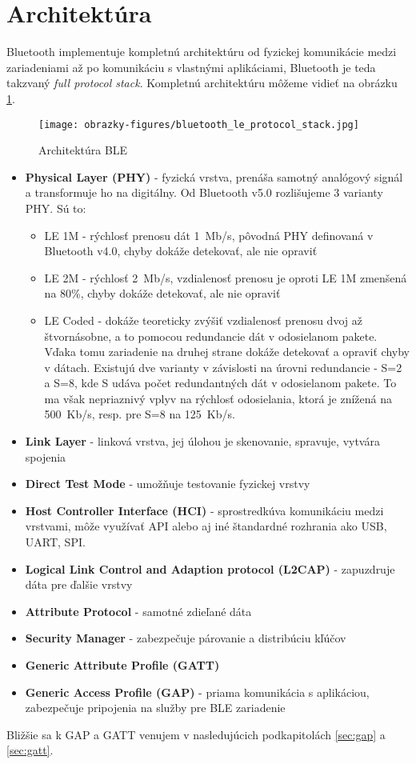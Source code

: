\section{Architektúra} \label{sec:arch}
Bluetooth implementuje kompletnú architektúru od fyzickej komunikácie medzi zariadeniami až po komunikáciu s vlastnými aplikáciami, Bluetooth je teda takzvaný \textit{full protocol stack}. Kompletnú architektúru môžeme vidieť na obrázku \ref{fig:ble_stack}.

\begin{figure}[ht]
    \centering
    \texttt{[image: obrazky-figures/bluetooth\_le\_protocol\_stack.jpg]}
    \caption{Architektúra BLE\cite{bluetooth}}
    \label{fig:ble_stack}
\end{figure}

\begin{itemize}
    \item \textbf{Physical Layer (PHY)} - fyzická vrstva, prenáša samotný analógový signál a transformuje ho na digitálny. Od Bluetooth v5.0 rozlišujeme 3 varianty PHY. Sú to:
    \begin{itemize}
        \item LE 1M - rýchlosť prenosu dát 1~Mb/s, pôvodná PHY definovaná v Bluetooth v4.0, chyby dokáže detekovať, ale nie opraviť
        \item LE 2M - rýchlosť 2~Mb/s, vzdialenosť prenosu je oproti LE 1M zmenšená na 80\%, chyby dokáže detekovať, ale nie opraviť
        \item LE Coded - dokáže teoreticky zvýšiť vzdialenosť prenosu dvoj až štvornásobne, a to pomocou redundancie dát v odosielanom pakete. Vďaka tomu zariadenie na druhej strane dokáže detekovať a opraviť chyby v dátach. Existujú dve varianty v závislosti na úrovni redundancie - S=2 a S=8, kde S udáva počet redundantných dát v odosielanom pakete. To ma však nepriaznivý vplyv na rýchlosť odosielania, ktorá je znížená na 500~Kb/s, resp. pre S=8 na 125~Kb/s. 
    \end{itemize}
    \item \textbf{Link Layer} - linková vrstva, jej úlohou je skenovanie, spravuje, vytvára spojenia
    \item \textbf{Direct Test Mode} - umožňuje testovanie fyzickej vrstvy
    \item \textbf{Host Controller Interface (HCI)} - sprostredkúva komunikáciu medzi vrstvami, môže využívať API alebo aj iné štandardné rozhrania ako USB, UART, SPI. 
    \item \textbf{Logical Link Control and Adaption protocol (L2CAP)} - zapuzdruje dáta pre ďalšie vrstvy
    \item \textbf{Attribute Protocol} - samotné zdieľané dáta
    \item \textbf{Security Manager} - zabezpečuje párovanie a distribúciu kľúčov
    \item \textbf{Generic Attribute Profile (GATT)}
    \item \textbf{Generic Access Profile (GAP)} - priama komunikácia s aplikáciou, zabezpečuje pripojenia na služby pre BLE zariadenie
    \cite{bluetooth}\cite{ble-arch}
\end{itemize}
Bližšie sa k GAP a GATT venujem v nasledujúcich podkapitolách \ref{sec:gap} a \ref{sec:gatt}.

